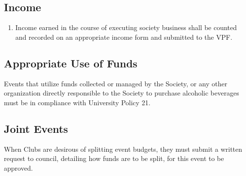 \subsection{Income}
\begin{enumerate}
\item Income earned in the course of executing society business shall be counted and recorded on an appropriate income form and submitted to the VPF.
\end{enumerate}

\subsection{Appropriate Use of Funds}
Events that utilize funds collected or managed by the Society, or any other organization directly responsible to the Society to purchase alcoholic beverages must be in compliance with University Policy 21.

\subsection{Joint Events}

When Clubs are desirous of splitting event budgets, they must submit a written request to council, detailing how funds are to be split, for this event to be approved.